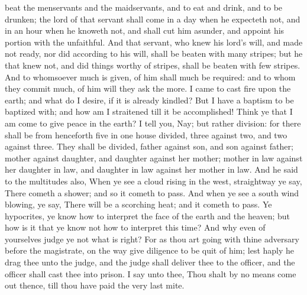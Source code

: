beat the menservants and the maidservants, and to eat and drink, and to be drunken; the lord of that servant shall come in a day when he expecteth not, and in an hour when he knoweth not, and shall cut him asunder, and appoint his portion with the unfaithful. And that servant, who knew his lord’s will, and made not ready, nor did according to his will, shall be beaten with many stripes; but he that knew not, and did things worthy of stripes, shall be beaten with few stripes. And to whomsoever much is given, of him shall much be required: and to whom they commit much, of him will they ask the more.  I came to cast fire upon the earth; and what do I desire, if it is already kindled? But I have a baptism to be baptized with; and how am I straitened till it be accomplished! Think ye that I am come to give peace in the earth? I tell you, Nay; but rather division: for there shall be from henceforth five in one house divided, three against two, and two against three. They shall be divided, father against son, and son against father; mother against daughter, and daughter against her mother; mother in law against her daughter in law, and daughter in law against her mother in law.  And he said to the multitudes also, When ye see a cloud rising in the west, straightway ye say, There cometh a shower; and so it cometh to pass. And when ye see a south wind blowing, ye say, There will be a scorching heat; and it cometh to pass. Ye hypocrites, ye know how to interpret the face of the earth and the heaven; but how is it that ye know not how to interpret this time? And why even of yourselves judge ye not what is right? For as thou art going with thine adversary before the magistrate, on the way give diligence to be quit of him; lest haply he drag thee unto the judge, and the judge shall deliver thee to the officer, and the officer shall cast thee into prison. I say unto thee, Thou shalt by no means come out thence, till thou have paid the very last mite. 


